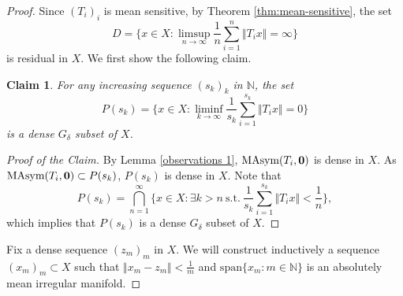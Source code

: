 \documentclass[12pt,a4paper]{amsart}
\theoremstyle{definition}
\theoremstyle{plain}
\newtheorem{claim}[defn]{Claim}
\begin{document}
\begin{proof}
    Since $(T_i)_i$ is mean sensitive, by Theorem \ref{thm:mean-sensitive}, the set
    \[
        D=\biggl\{ x\in X\colon \limsup_{n\to{\infty}}\frac{1}{n}\sum_{i=1}^{n}\Vert T_i x\Vert=\infty \biggr \}
    \]
    is residual in $X$.
    We first show the following claim.
    \begin{claim} \label{$P(s_k)$ is residual}
        For any increasing sequence $(s_k)_k$ in $\mathbb{N}$,
        the set
        \[
            P(s_k)=\biggl\{x\in X: \liminf_{k\to \infty} \frac{1}{s_k} \sum_{i=1}^{s_k} \Vert T_i x \Vert=0 \biggr\}
        \]
        is a dense $G_{\delta}$ subset of $X$.
    \end{claim}
    \begin{proof}[Proof of the Claim]
        By Lemma \ref{observations 1}, $\text{MAsym}(T_i, {\bf 0})$ is dense in $X$.
        As $\text{MAsym}(T_i, {\bf 0}) \subset P(s_k)$, $P(s_k)$ is dense in $X$.
        Note that
        \[
            P(s_k)=\bigcap_{n=1}^{\infty} \biggl\{x\in X: \exists k>n  \ \text{s.t.} \  \frac{1}{s_k} \sum_{i=1}^{s_k} \Vert T_i x \Vert<\frac{1}{n}\biggr\},
        \]
        which implies that $P(s_k)$ is a dense $G_{\delta}$ subset of $X$.
    \end{proof}

    Fix a dense sequence $(z_m)_m$ in $X$.
    We will construct inductively a sequence $(x_m)_m \subset X$ such that
    $\Vert x_m-z_m \Vert <\frac{1}{m}$ and $\text{span} \{x_m: m\in \mathbb{N}\}$ is an absolutely mean irregular manifold.


\end{proof}
\end{document}

